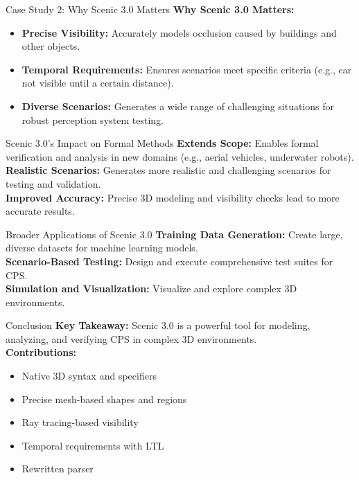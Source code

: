 \documentclass{beamer}
\begin{document}
\begin{frame}{Case Study 2: Why Scenic 3.0 Matters}
\textbf{Why Scenic 3.0 Matters:}
\begin{itemize}
    \setlength{\itemindent}{-1em} 
\item \textbf{Precise Visibility:} Accurately models occlusion caused by buildings and other objects.
\item \textbf{Temporal Requirements:} Ensures scenarios meet specific criteria (e.g., car not visible until a certain distance).
\item \textbf{Diverse Scenarios:} Generates a wide range of challenging situations for robust perception system testing.
\end{itemize}
\end{frame}


\begin{frame}{Scenic 3.0's Impact on Formal Methods}
    \textbf{Extends Scope:} Enables formal verification and analysis in new domains (e.g., aerial vehicles, underwater robots).\\
    \textbf{Realistic Scenarios:} Generates more realistic and challenging scenarios for testing and validation.\\
    \textbf{Improved Accuracy:} Precise 3D modeling and visibility checks lead to more accurate results.
\end{frame}

\begin{frame}{Broader Applications of Scenic 3.0}
    \textbf{Training Data Generation:} Create large, diverse datasets for machine learning models.\\
    \textbf{Scenario-Based Testing:} Design and execute comprehensive test suites for CPS.\\
    \textbf{Simulation and Visualization:} Visualize and explore complex 3D environments.
\end{frame}

\begin{frame}{Conclusion}
    \textbf{Key Takeaway:} Scenic 3.0 is a powerful tool for modeling, analyzing, and verifying CPS in complex 3D environments.\\
    \textbf{Contributions:}
    \begin{itemize}
        \item Native 3D syntax and specifiers
        \item Precise mesh-based shapes and regions
        \item Ray tracing-based visibility
        \item Temporal requirements with LTL
        \item Rewritten parser
    \end{itemize}
\end{frame}
\end{document}
